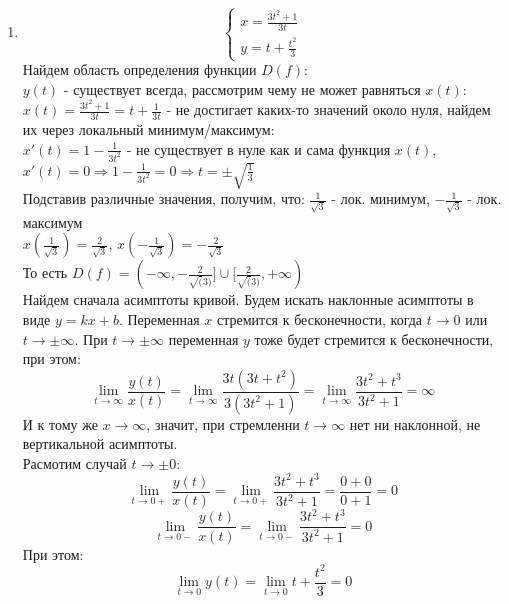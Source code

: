 \begin{enumerate}
    \item 
    \begin{equation*}
        \begin{cases}
            x = \frac{3t^2 +1}{3t} \\
            y = t + \frac{t^2}{3}
        \end{cases}
    \end{equation*}
    Найдем область определения функции $D(f)$: \\
    $y(t)$ - существует всегда, рассмотрим чему не может равняться $x(t)$:\\
    $x(t) = \frac{3t^2 +1}{3t} = t + \frac{1}{3t}$ - не достигает каких-то значений около нуля, найдем их через локальный минимум/максимум: \\
    $x'(t) = 1 - \frac{1}{3t^2}$ - не существует в нуле как и сама функция $x(t)$,
    $x'(t) = 0 \Rightarrow 1 - \frac{1}{3t^2} = 0 \Rightarrow t = \pm \sqrt{\frac{1}{3}}$ \\
    Подставив различные значения, получим, что: $\frac{1}{\sqrt{3}}$ - лок. минимум, $-\frac{1}{\sqrt{3}}$ - лок. максимум \\
    $x(\frac{1}{\sqrt{3}}) = \frac{2}{\sqrt{3}}$, $x(-\frac{1}{\sqrt{3}}) = -\frac{2}{\sqrt{3}}$ \\
    То есть $D(f) = (-\infty,-\frac{2}{\sqrt(3)}] \cup [\frac{2}{\sqrt(3)},+\infty)$ \\
    Найдем сначала асимптоты кривой. Будем искать наклонные асимптоты в виде $y = kx + b$. Переменная $x$ стремится к бесконечности, когда $t\rightarrow 0$ или $t\rightarrow \pm \infty$. 
    При $t \rightarrow \pm \infty$ переменная $y$ тоже будет стремится к бесконечности, при этом: \\
    \[
        \lim_{t\rightarrow \infty }{\frac{y(t)}{x(t)}} = \lim_{t\rightarrow \infty }{\frac{3t(3t+t^2)}{3(3t^2+1)}}=\lim_{t\rightarrow \infty }{\frac{3t^2+t^3}{3t^2+1}} = \infty
    \] 
    И к тому же $x\rightarrow\infty$, значит, при стремленни $t\rightarrow\infty$ нет ни наклонной, не вертикальной асимптоты. \\
    Расмотим случай $t\rightarrow \pm 0$: \\
    \[
        \lim_{t\rightarrow0+}{\frac{y(t)}{x(t)}}=\lim_{t\rightarrow0+}{\frac{3t^2+t^3}{3t^2+1}}=\frac{0+0}{0+1}=0
    \]
    \[
        \lim_{t\rightarrow0-}{\frac{y(t)}{x(t)}}=\lim_{t\rightarrow0-}{\frac{3t^2+t^3}{3t^2+1}}=0
    \]
    При этом:
    \[
        \lim_{t\rightarrow0}{y(t)} = \lim_{t\rightarrow0}{t+\frac{t^2}{3}} = 0
\]
\end{enumerate}
